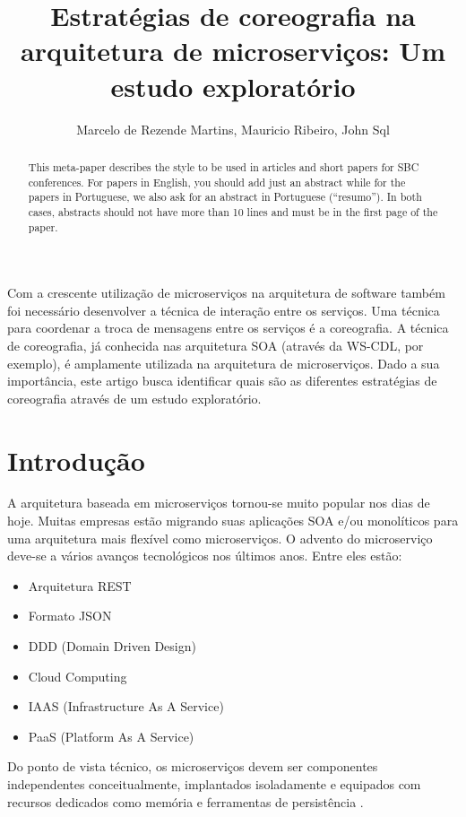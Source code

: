 \documentclass[12pt]{article}
\title{Estratégias de coreografia na arquitetura de microserviços: Um estudo exploratório}
\author{Marcelo de Rezende Martins\inst{1}, Mauricio Ribeiro\inst{1}, John Sql\inst{1} }
\theoremstyle{plain}
\begin{document}
 

\maketitle

\begin{abstract}
  This meta-paper describes the style to be used in articles and short papers
  for SBC conferences. For papers in English, you should add just an abstract
  while for the papers in Portuguese, we also ask for an abstract in
  Portuguese (``resumo''). In both cases, abstracts should not have more than
  10 lines and must be in the first page of the paper.
\end{abstract}
     
\begin{resumo} 
  Com a crescente utilização de microserviços na arquitetura de software também foi necessário desenvolver a técnica de interação entre os serviços. Uma técnica para coordenar a troca de mensagens entre os serviços é a coreografia. A técnica de coreografia, já conhecida nas arquitetura SOA (através da WS-CDL, por exemplo), é amplamente utilizada na arquitetura de microserviços. Dado a sua importância, este artigo busca identificar quais são as diferentes estratégias de coreografia através de um estudo exploratório. 
\end{resumo}


\section{Introdução}

A arquitetura baseada em microserviços tornou-se muito popular nos dias de hoje. Muitas empresas estão migrando suas aplicações SOA e/ou monolíticos para uma arquitetura mais flexível como microserviços. O advento do microserviço deve-se a vários avanços tecnológicos nos últimos anos. Entre eles estão:
\begin{itemize}
    \item Arquitetura REST
    \item Formato JSON
    \item DDD (Domain Driven Design)
    \item Cloud Computing
    \item IAAS (Infrastructure As A Service)
    \item PaaS (Platform As A Service)
\end{itemize}

Do ponto de vista técnico, os microserviços devem ser componentes independentes conceitualmente, implantados isoladamente e equipados com recursos dedicados como memória e ferramentas de persistência \cite{Dragoni2017}.
\end{document}
